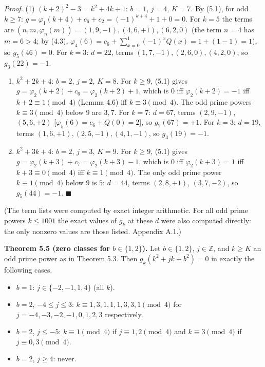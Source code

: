 \emph{Proof.} (1) \((k+2)^2-3=k^2+4k+1\): \(b=1\), \(j=4\), \(K=7\). By (5.1), for odd \(k\ge7\): \(g=\varphi_1(k+4)+c_6+c_2=(-1)^{k+4}+1+0=0\). For \(k=5\) the terms are \((n,m,\varphi_n(m))=(1,9,-1),(4,6,+1),(6,2,0)\) (the term \(n=4\) has \(m=6>4\); by (4.3), \(\varphi_4(6)=c_6+\sum_{x=0}^{1}(-1)^xQ(x)=1+(1-1)=1\)), so \(g_5(46)=0\). For \(k=3\): \(d=22\), terms \((1,7,-1),(2,6,0),(4,2,0)\), so \(g_3(22)=-1\).

\begin{enumerate}
\def\labelenumi{(\arabic{enumi})}
\setcounter{enumi}{1}
\item
  \(k^2+2k+4\): \(b=2\), \(j=2\), \(K=8\). For \(k\ge9\), (5.1) gives \(g=\varphi_2(k+2)+c_6=\varphi_2(k+2)+1\), which is \(0\) iff \(\varphi_2(k+2)=-1\) iff \(k+2\equiv1\pmod 4\) (Lemma 4.6) iff \(k\equiv3\pmod4\). The odd prime powers \(k\equiv3\pmod 4\) below \(9\) are \(3,7\). For \(k=7\): \(d=67\), terms \((2,9,-1)\), \((5,6,+2)\) {[}\(\varphi_5(6)=c_6+Q(0)=2\){]}, so \(g_7(67)=+1\). For \(k=3\): \(d=19\), terms \((1,6,+1),(2,5,-1),(4,1,-1)\), so \(g_3(19)=-1\).
\item
  \(k^2+3k+4\): \(b=2\), \(j=3\), \(K=9\). For \(k\ge9\), (5.1) gives \(g=\varphi_2(k+3)+c_7=\varphi_2(k+3)-1\), which is \(0\) iff \(\varphi_2(k+3)=1\) iff \(k+3\equiv0\pmod4\) iff \(k\equiv1\pmod4\). The only odd prime power \(k\equiv1\pmod 4\) below \(9\) is \(5\): \(d=44\), terms \((2,8,+1)\), \((3,7,-2)\), so \(g_5(44)=-1\). \(\blacksquare\)
\end{enumerate}

(The term lists were computed by exact integer arithmetic. For all odd prime powers \(k\le1001\) the exact values of \(g_k\) at these \(d\) were also computed directly: the only nonzero values are those listed. Appendix A.1.)

\textbf{Theorem 5.5 (zero classes for \(b\in\{1,2\}\)).} Let \(b\in\{1,2\}\), \(j\in\mathbb{Z}\), and \(k\ge K\) an odd prime power as in Theorem 5.3. Then \(g_k(k^2+jk+b^2)=0\) in exactly the following cases.

\begin{itemize}
\tightlist
\item
  \(b=1\): \(j\in\{-2,-1,1,4\}\) (all \(k\)).
\item
  \(b=2\), \(-4\le j\le3\): \(k\equiv 1,3,1,1,1,3,3,1 \pmod 4\) for \(j=-4,-3,-2,-1,0,1,2,3\) respectively.
\item
  \(b=2\), \(j\le-5\): \(k\equiv1\pmod 4\) if \(j\equiv1,2\pmod 4\) and \(k\equiv3\pmod 4\) if \(j\equiv0,3\pmod 4\).
\item
  \(b=2\), \(j\ge4\): never.
\end{itemize}


